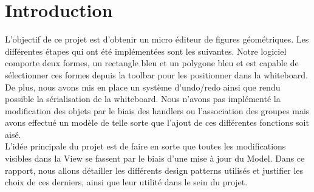 \chapter{Introduction}

L'objectif de ce projet est d'obtenir un micro éditeur de figures géométriques. Les différentes étapes qui ont été implémentées sont les suivantes. Notre logiciel comporte deux formes, un rectangle bleu et
un polygone bleu et est capable de sélectionner ces formes depuis la toolbar pour les positionner dans la whiteboard. De plus, nous avons mis en place un système d'undo/redo ainsi que rendu possible la sérialisation
de la whiteboard. Nous n'avons pas implémenté la modification des objets par le biais des handlers ou l'association des groupes mais avons effectué un modèle de telle sorte que l'ajout de ces différentes fonctions soit aisé.
\\
L'idée principale du projet est de faire en sorte que toutes les modifications visibles dans la View se fassent par le biais d'une mise à jour du Model. Dans ce rapport, nous allons détailler les différents design patterns utilisés et justifier les choix de ces derniers, ainsi que leur utilité dans le sein du projet.
